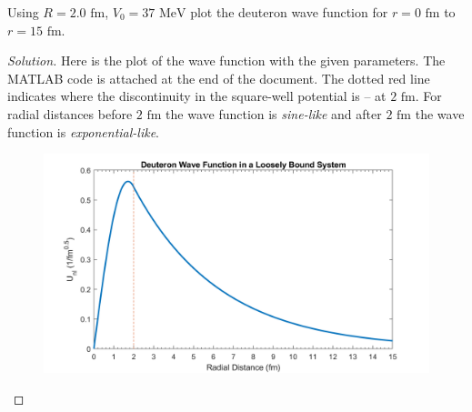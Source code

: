\documentclass[12pt]{article}
\renewcommand{\=}[1]{\stackrel{#1}{=}} %
\newenvironment{problem}[2][Problem]{\begin{trivlist}
\item[\hskip \labelsep {\bfseries #1}\hskip \labelsep {\bfseries #2.}]}{\end{trivlist}}
\newenvironment{solution}{\begin{proof}[Solution]}{\end{proof}}
\begin{document}
    \begin{problem}{2}
        Using $R = 2.0 \text{ fm}$, $V_0 = 37 \text{ MeV}$ plot the deuteron wave function for $r = 0 \text{ fm}$ to $r = 15 \text{ fm}$.\\
        
        
    \end{problem}
    
    \begin{solution}
        Here is the plot of the wave function with the given parameters. The MATLAB code is attached at the end of the document. The dotted red line indicates where the discontinuity in the square-well potential is -- at $2 \text{ fm}$. For radial distances before $2 \text{ fm}$ the wave function is \textit{sine-like} and after $2 \text{ fm}$ the wave function is \textit{exponential-like}.
        
        \begin{figure}[h!]
            \includegraphics[scale=0.3]{fig1}
            \centering
        \end{figure}
        
    \end{solution}
    
    \pagebreak

\end{document}
